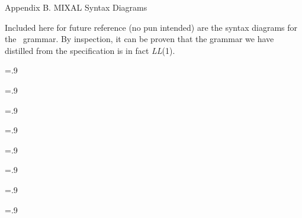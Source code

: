 \beginchapter Appendix B. MIXAL Syntax Diagrams

Included here for future reference (no pun intended) are the syntax diagrams for the \MIXAL\ grammar.
By inspection, it can be proven that the grammar we have distilled from the specification
is in fact {\it LL}(1).

\epsfxsize=.9\hsize
\centerline{}
\bigskip
\epsfxsize=.9\hsize
\centerline{}
\bigskip
\epsfxsize=.9\hsize
\centerline{}
\bigskip
\epsfxsize=.9\hsize
\centerline{}
\bigskip
\epsfxsize=.9\hsize
\centerline{}
\bigskip
\epsfxsize=.9\hsize
\centerline{}
\bigskip
\epsfxsize=.9\hsize
\centerline{}
\bigskip
\epsfxsize=.9\hsize
\centerline{}
\endchapter
\eject